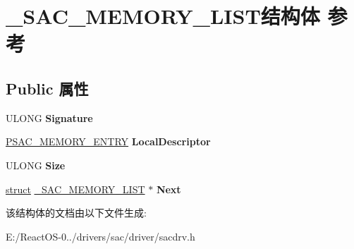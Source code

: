 \hypertarget{struct___s_a_c___m_e_m_o_r_y___l_i_s_t}{}\section{\+\_\+\+S\+A\+C\+\_\+\+M\+E\+M\+O\+R\+Y\+\_\+\+L\+I\+S\+T结构体 参考}
\label{struct___s_a_c___m_e_m_o_r_y___l_i_s_t}
\subsection*{Public 属性}
\begin{DoxyCompactItemize}
\item 
\mbox{\label{struct___s_a_c___m_e_m_o_r_y___l_i_s_t_a3b6830b8a806a5f4888b6126e44c718c}} 
U\+L\+O\+NG {\bfseries Signature}
\item 
\mbox{\label{struct___s_a_c___m_e_m_o_r_y___l_i_s_t_a77df8ecb2287c8835555b4023e9a0c23}} 
\hyperlink{struct___s_a_c___m_e_m_o_r_y___e_n_t_r_y}{P\+S\+A\+C\+\_\+\+M\+E\+M\+O\+R\+Y\+\_\+\+E\+N\+T\+RY} {\bfseries Local\+Descriptor}
\item 
\mbox{\label{struct___s_a_c___m_e_m_o_r_y___l_i_s_t_af249cafd56bed4c5bfd9bd643a39eb42}} 
U\+L\+O\+NG {\bfseries Size}
\item 
\mbox{\label{struct___s_a_c___m_e_m_o_r_y___l_i_s_t_ac83d697e6cc1fa69f7a3631a56630aab}} 
\hyperlink{interfacestruct}{struct} \hyperlink{struct___s_a_c___m_e_m_o_r_y___l_i_s_t}{\+\_\+\+S\+A\+C\+\_\+\+M\+E\+M\+O\+R\+Y\+\_\+\+L\+I\+ST} $\ast$ {\bfseries Next}
\end{DoxyCompactItemize}


该结构体的文档由以下文件生成\+:\begin{DoxyCompactItemize}
\item 
E\+:/\+React\+O\+S-\/0../drivers/sac/driver/sacdrv.\+h\end{DoxyCompactItemize}
